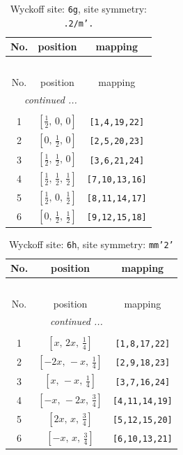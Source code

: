 \documentclass[fleqn,8pt]{jsarticle}
\begin{document}
\renewcommand{\arraystretch}{1.2}
\begin{longtable}{ccc}
\caption{Wyckoff site: {\tt 6g}, site symmetry: {\tt .2/m'.}}
 \\
 \hline \hline
No. & position & mapping \\ \hline \endfirsthead

\multicolumn{2}{l}{\tablename\ \thetable{}} \\
 \hline \hline
No. & position & mapping \\ \hline \endhead

 \hline \hline
\multicolumn{2}{r}{\footnotesize\it continued ...} \\ \endfoot

 \hline \hline
\multicolumn{2}{r}{} \\ \endlastfoot

1 & $\left[ \frac{1}{2},\, 0,\, 0 \right]$ & {\tt [1,4,19,22]} \\ \hline
2 & $\left[ 0,\, \frac{1}{2},\, 0 \right]$ & {\tt [2,5,20,23]} \\ \hline
3 & $\left[ \frac{1}{2},\, \frac{1}{2},\, 0 \right]$ & {\tt [3,6,21,24]} \\ \hline
4 & $\left[ \frac{1}{2},\, \frac{1}{2},\, \frac{1}{2} \right]$ & {\tt [7,10,13,16]} \\ \hline
5 & $\left[ \frac{1}{2},\, 0,\, \frac{1}{2} \right]$ & {\tt [8,11,14,17]} \\ \hline
6 & $\left[ 0,\, \frac{1}{2},\, \frac{1}{2} \right]$ & {\tt [9,12,15,18]} \\
\end{longtable}
\renewcommand{\arraystretch}{1.2}
\begin{longtable}{ccc}
\caption{Wyckoff site: {\tt 6h}, site symmetry: {\tt mm'2'}}
 \\
 \hline \hline
No. & position & mapping \\ \hline \endfirsthead

\multicolumn{2}{l}{\tablename\ \thetable{}} \\
 \hline \hline
No. & position & mapping \\ \hline \endhead

 \hline \hline
\multicolumn{2}{r}{\footnotesize\it continued ...} \\ \endfoot

 \hline \hline
\multicolumn{2}{r}{} \\ \endlastfoot

1 & $\left[ x,\, 2 x,\, \frac{1}{4} \right]$ & {\tt [1,8,17,22]} \\ \hline
2 & $\left[ - 2 x,\, - x,\, \frac{1}{4} \right]$ & {\tt [2,9,18,23]} \\ \hline
3 & $\left[ x,\, - x,\, \frac{1}{4} \right]$ & {\tt [3,7,16,24]} \\ \hline
4 & $\left[ - x,\, - 2 x,\, \frac{3}{4} \right]$ & {\tt [4,11,14,19]} \\ \hline
5 & $\left[ 2 x,\, x,\, \frac{3}{4} \right]$ & {\tt [5,12,15,20]} \\ \hline
6 & $\left[ - x,\, x,\, \frac{3}{4} \right]$ & {\tt [6,10,13,21]} \\
\end{longtable}
\end{document}
